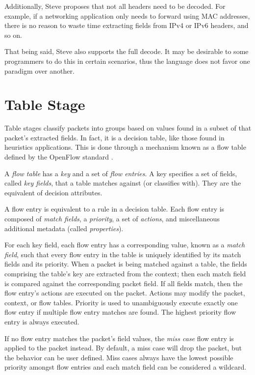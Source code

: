 Additionally, Steve proposes that not all headers need to be decoded. For
example, if a networking application only needs to forward using MAC addresses,
there is no reason to waste time extracting fields from IPv4 or IPv6 headers,
and so on.

That being said, Steve also supports the full decode. It may be desirable to
some programmers to do this in certain scenarios, thus the language does not
favor one paradigm over another.

\section{Table Stage} \label{table_desc}

Table stages classify packets into groups based on values found in a subset of that packet's extracted fields. In fact, it is a decision table, like those found in heuristics applications. This is done
through a mechanism known as a flow table defined by the OpenFlow standard
\cite{openflow_spec}.

A \textit{flow table} has a \textit{key} and a set of \textit{flow entries}.
A key specifies a set of fields, called \textit{key fields}, that a table matches against (or classifies with). They are the equivalent of decision attributes.

A flow entry is equivalent to a rule in a decision table. Each flow entry is composed of \textit{match fields}, a \textit{priority}, a set of
\textit{actions}, and miscellaneous additional metadata (called \textit{properties}). 

For each key field,
each flow entry has a corresponding value, known as a \textit{match field}, such
that every flow entry in the table is uniquely identified by its match fields
and its priority. When a packet is being matched against a table, the fields comprising the table's
key are extracted from the context; then each match field is compared against the corresponding packet field. If all fields match, then the flow entry's actions are executed on the packet. Actions may modify the packet, context, or flow tables. Priority is used to unambiguously execute exactly one flow entry if multiple flow entry matches are found. The highest priority flow entry is always executed.

If no flow entry matches the packet's field values, the
\textit{miss case} flow entry is applied to the packet instead. By default, a 
miss case will drop the packet, but the behavior can be user defined. Miss cases always have the lowest possible priority amongst flow
entries and each match field can be considered a wildcard.

